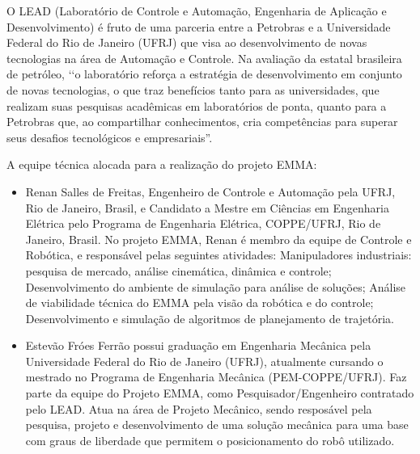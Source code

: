 O LEAD (Laboratório de Controle e Automação, Engenharia de Aplicação e
Desenvolvimento) é fruto de uma parceria entre a Petrobras e a Universidade
Federal do Rio de Janeiro (UFRJ) que visa ao desenvolvimento de novas
tecnologias na área de Automação e Controle.
Na avaliação da estatal brasileira de petróleo, ‘‘o laboratório reforça a
estratégia de desenvolvimento em conjunto de novas tecnologias, o que traz
benefícios tanto para as universidades, que realizam suas pesquisas acadêmicas
em laboratórios de ponta, quanto para a Petrobras que, ao compartilhar
conhecimentos, cria competências para superar seus desafios tecnológicos e
empresariais”.


A equipe técnica alocada para a realização do projeto EMMA:

\begin{itemize}
  \item Renan Salles de Freitas, Engenheiro de Controle e
Automação pela UFRJ, Rio de Janeiro, Brasil, e Candidato a Mestre em Ciências em Engenharia Elétrica
pelo Programa de Engenharia Elétrica, COPPE/UFRJ, Rio de Janeiro, Brasil. No
projeto EMMA, Renan é membro da equipe de Controle e Robótica, e responsável
pelas seguintes atividades: Manipuladores industriais: pesquisa de
mercado, análise cinemática, dinâmica e controle; Desenvolvimento do ambiente de
simulação para análise de soluções; Análise de viabilidade técnica do EMMA pela
visão da robótica e do controle; Desenvolvimento e simulação de algoritmos de
planejamento de trajetória.

  \item Estevão Fróes Ferrão possui graduação em Engenharia Mecânica pela Universidade
Federal do Rio de Janeiro (UFRJ), atualmente cursando o mestrado no Programa de Engenharia
Mecânica (PEM-COPPE/UFRJ). Faz parte da equipe do Projeto EMMA, como
Pesquisador/Engenheiro contratado pelo LEAD. Atua na área de Projeto Mecânico,
sendo resposável pela pesquisa, projeto e desenvolvimento de uma solução
mecânica para uma base com graus de liberdade que permitem o posicionamento do
robô utilizado.


\end{itemize}
